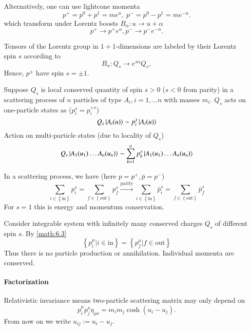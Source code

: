 Alternatively, one can use lightcone momenta
\begin{equation*}
	p^+ = p^0 + p^1 = m e^u, \;
	p^- = p^0 - p^1 = m e^{-u}.
\end{equation*}
which transform under Lorentz boosts $B_\alpha: u \rightarrow u + \alpha$
\begin{equation*}
	p^+ \rightarrow p^+ e^\alpha, p^- \rightarrow p^- e^{-\alpha}.
\end{equation*}

Tensors of the Lorentz group in $1+1$-dimensions are labeled by their Lorentz spin $s$ according to
\begin{equation*}
	B_\alpha: Q_s \rightarrow e^{s\alpha} Q_s ,
	\label{math:6.1}
\end{equation*}
Hence, $p^\pm$ have spin $s=\pm 1$.

Suppose $Q_s$ is local conserved quantity of spin $s > 0$ ($s<0$ from parity) in a scattering process of $n$ particles of type $A_i, i = 1, \dots n$ with masses $m_i$. $Q_s$ acts on one-particle states as  ($p_i^s = p_i^{+ s}$)
\begin{equation*}
	Q_s \ket{A_i(u)} \sim p^s_i \ket{A_i(u)}
\end{equation*}
Action on multi-particle states (due to locality of $Q_s$)
\begin{equation}
	Q_s \ket{A_1(u_1) \dots A_n (u_n)} \sim \sum_{k=1}^n p^s_k \ket{A_1 (u_1) \dots A_n (u_n)}
	\label{math:6.2}
\end{equation}

In a scattering process, we have (here $p=p^+, \bar{p} = p^-$)
\begin{equation}
	\sum_{i \in \left\{ \text{in} \right\} } p^s_i = \sum_{f \in \left\{ \text{out} \right\} } p_f^s \stackrel{\text{parity}}{\rightarrow} 
	\sum_{i \in \left\{ \text{in} \right\} } \bar{p}^s_i = \sum_{f \in \left\{ \text{out} \right\} } \bar{p}_f^s
	\label{math:6.3}
\end{equation}
For $s=1$ this is energy and momentum conservation. 

Consider integrable system with infinitely many conserved charges $Q_s$ of different spin $s$. By \eqref{math:6.3}
\begin{equation}
	\left\{ p_i^\mu | i \in \text{in} \right\}  = \left\{ p_f^\mu | f \in \text{out} \right\} 
\end{equation}
Thus there is no particle production or annihilation. Individual momenta are conserved.

\paragraph{Factorization}
Relativistic invariance means two-particle scattering matrix may only depend on
\begin{equation*}
	p^\mu_i p_j^\nu \eta_{\mu\nu} = m_i m_j \cosh(u_i - u_j).
\end{equation*}
From now on we write $u_{ij} := u_i - u_j$.

